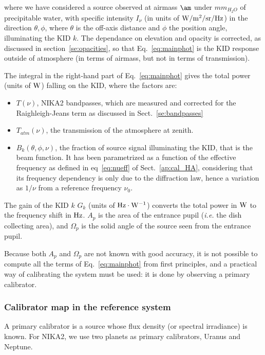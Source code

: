 where we have considered a source observed at airmass $\am$ under
$mm_{H_{2}O}$ of precipitable water, with specific intensity $I_{\nu}$ (in units
of  ${\rm W/m^{2}/sr/Hz}$) in the direction $\theta, \phi$, where $\theta$
is the off-axis distance and $\phi$ the position angle, illuminating the KID $k$. 
The dependance on elevation and opacity is corrected, as discussed in
section~\ref{se:opacities}, so that Eq.~\ref{eq:mainphot} is the KID
response outside of atmosphere (in terms of airmass, but not in terms
of transmission).

The integral in the right-hand part of Eq.~\ref{eq:mainphot} gives the total power (units of $\rm W$)
falling on the KID, where the factors are:
\begin{itemize}
\item $T(\nu)$, NIKA2 bandpasses, which are measured and corrected for the Raighleigh-Jeans term as discussed in Sect.~\ref{se:bandpasses}
\item $T_{atm}(\nu)$, the transmission of the atmosphere at zenith. 
\item $B_{k} (\theta, \phi, \nu)$, the fraction of source signal illuminating the KID, that is the beam function. It has been parametrized as a function of the effective frequency as defined in eq~\ref{eq:nueff} of Sect.~\ref{ap:cal_HA},
considering that its frequency dependency is only due to the diffraction law, hence a variation as $1/\nu$ from a reference frequency $\nu_0$.  
\end{itemize}

The gain of the KID $k$ $G_{k}$ (units of  $\rm Hz \cdot \rm W^{-1}$) converts the total power in $\rm W$
to the frequency shift in $\rm Hz$. $A_{p}$ is the area of the entrance pupil ({\it i.e.} the
dish collecting area), and $\Omega_{p}$ is the solid angle of the source seen from the
entrance pupil.

Because both $A_{p}$ and $ \Omega_{p} $ are not known with good
accuracy, it is not possible to compute all the terms of
Eq.~\ref{eq:mainphot} from first principles, and a practical way of
calibrating the system must be used: it is done by observing a primary
calibrator.


\subsubsection{Calibrator map in the reference system}

A primary calibrator is a source whose flux density (or spectral irradiance) is
known. For NIKA2, we use two planets as primary calibrators, Uranus
and Neptune.

